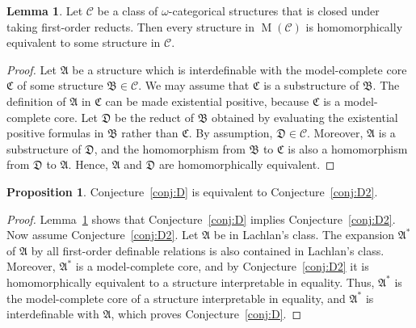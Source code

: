 \documentclass{amsart}
\theoremstyle{definition}
\newtheorem{lemma}[theorem]{Lemma}
\newtheorem{proposition}[theorem]{Proposition}
\theoremstyle{remark}
\numberwithin{equation}{section}
\DeclareMathOperator{\M}{\operatorname{M}}
\newcommand{\fa}{\mathfrak{A}}
\newcommand{\fb}{\mathfrak{B}}
\newcommand{\fc}{\mathfrak{C}}
\newcommand{\fd}{\mathfrak{D}}
\begin{document}
\begin{lemma}\label{lem:MH}
    Let $\mathcal{C}$ be a class of 
$\omega$-categorical 
structures that is closed under taking first-order reducts. Then every structure in $\M({\mathcal C})$ is homomorphically equivalent to some structure in $\mathcal{C}$.
\end{lemma}
\begin{proof}
    Let $\fa$ be a structure 
    which is interdefinable with the model-complete core $\fc$ of some structure $\fb \in \mathcal C$. 
We may assume that $\fc$ is a substructure of $\fb$. 
The definition of $\fa$ in $\fc$ can be made existential positive, because $\fc$ is a model-complete core. 
Let $\fd$ be the reduct of $\fb$ obtained by evaluating the existential positive formulas in $\fb$ rather than $\fc$. By assumption, $\fd \in {\mathcal C}$. 
Moreover, $\fa$ is a substructure of $\fd$,
and the homomorphism from $\fb$ to $\fc$ is also a homomorphism from $\fd$ to $\fa$. Hence, {$\fa$ and $\fd$ are homomorphically equivalent.}%
\end{proof} 

\begin{proposition}
    Conjecture~\ref{conj:D} is equivalent to Conjecture~\ref{conj:D2}. 
\end{proposition} 
\begin{proof}
    Lemma~\ref{lem:MH} shows that Conjecture~\ref{conj:D} implies Conjecture~\ref{conj:D2}. 
    Now assume Conjecture~\ref{conj:D2}. 
    Let $\fa$ be in Lachlan's class.
    The expansion
    $\fa^*$ of $\fa$ by all first-order definable relations is also contained in Lachlan's class. 
    Moreover, $\fa^*$ is 
    a model-complete core, and by Conjecture~\ref{conj:D2} it is homomorphically equivalent to a structure interpretable in equality. Thus, $\fa^*$ is the model-complete core of a structure interpretable in  equality, and 
    $\fa^*$ is interdefinable with $\fa$, which proves Conjecture~\ref{conj:D}. 
\end{proof}
\end{document}
